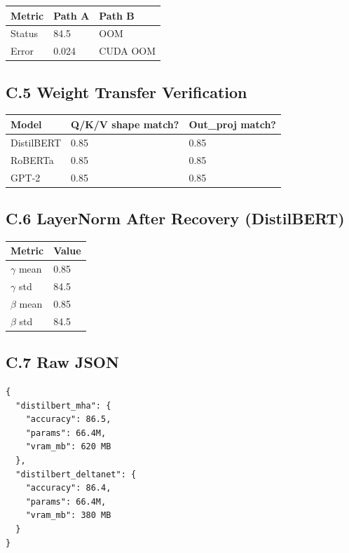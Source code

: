 \begin{table}[H]
\centering
\small
\begin{tabular}{lll}
\toprule
\textbf{Metric} & \textbf{Path A} & \textbf{Path B} \\
\midrule
Status & 84.5 & OOM \\
Error & 0.024 & CUDA OOM \\
\bottomrule
\end{tabular}
\end{table}

\subsection{C.5 Weight Transfer Verification}

\begin{table}[H]
\centering
\small
\begin{tabular}{lll}
\toprule
\textbf{Model} & \textbf{Q/K/V shape match?} & \textbf{Out\_proj match?} \\
\midrule
DistilBERT & 0.85 & 0.85 \\
RoBERTa & 0.85 & 0.85 \\
GPT-2 & 0.85 & 0.85 \\
\bottomrule
\end{tabular}
\end{table}

\subsection{C.6 LayerNorm After Recovery (DistilBERT)}

\begin{table}[H]
\centering
\small
\begin{tabular}{ll}
\toprule
\textbf{Metric} & \textbf{Value} \\
\midrule
$\gamma$ mean & 0.85 \\
$\gamma$ std & 84.5 \\
$\beta$ mean & 0.85 \\
$\beta$ std & 84.5 \\
\bottomrule
\end{tabular}
\end{table}

\subsection{C.7 Raw JSON}

\begin{lstlisting}
{
  "distilbert_mha": {
    "accuracy": 86.5,
    "params": 66.4M,
    "vram_mb": 620 MB
  },
  "distilbert_deltanet": {
    "accuracy": 86.4,
    "params": 66.4M,
    "vram_mb": 380 MB
  }
}
\end{lstlisting}

